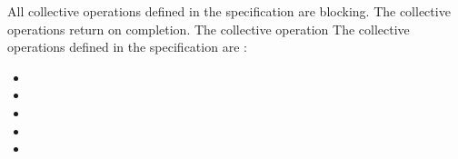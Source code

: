 All collective operations defined in the specification are blocking. The 
collective operations return on completion. The collective operation 
The collective operations defined in the \openshmem{} specification 
are :

\begin{itemize}
\item[] \broadcast{} 
\item[] \barrier{}
\item[] \barrierall{}
\item[] \collect{}
\item[] \reduction{} 
\end{itemize} 


